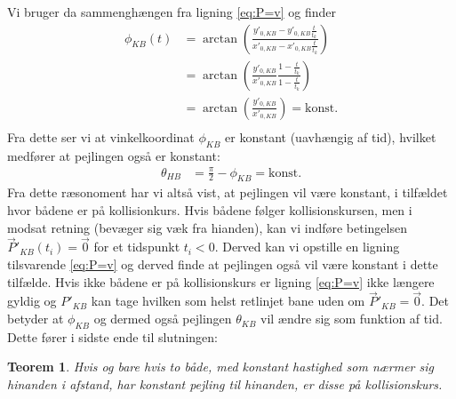 \documentclass[%
 reprint,
nofootinbib,
aps,
]{revtex4-1}
\newtheorem{theorem}{Teorem}
\begin{document}
Vi bruger da sammenghængen fra ligning \ref{eq:P=v} og finder
\begin{align*}
  \phi_{KB}(t) &= \arctan{\left( \frac{y'_{0,KB} - y'_{0,KB}\frac{t}{t_k}}{x'_{0,KB} - x'_{0,KB}\frac{t}{t_k}}\right)} \\
  &= \arctan{\left(\frac{y'_{0,KB}}{x'_{0,KB}} \frac{1 - \frac{t}{t_k}}{1 - \frac{t}{t_k}}\right)} \\
  &= \arctan{\left(\frac{y'_{0,KB}}{x'_{0,KB}}\right)} = \text{konst.} \\
\end{align*}
Fra dette ser vi at vinkelkoordinat $\phi_{KB}$ er konstant (uavhængig af tid), hvilket medfører at pejlingen også er konstant:
\begin{align*}
  \theta_{HB} &= \frac{\pi}{2} - \phi_{KB} = \text{konst.}
\end{align*}
Fra dette ræsonoment har vi altså vist, at pejlingen vil være konstant, i tilfældet hvor bådene er på kollisionkurs. Hvis bådene følger kollisionskursen, men i modsat retning (bevæger sig væk fra hianden), kan vi indføre betingelsen $\vec{P}'_{KB}(t_i) = \vec{0}$ for et tidspunkt $t_i < 0$. Derved kan vi opstille en ligning tilsvarende \ref{eq:P=v} og derved finde at pejlingen også vil være konstant i dette tilfælde. Hvis ikke bådene er på kollisionskurs er ligning \ref{eq:P=v} ikke længere gyldig og $P'_{KB}$ kan tage hvilken som helst retlinjet bane uden om $\vec{P}'_{KB} = \vec{0}$. Det betyder at $\phi_{KB}$ og dermed også pejlingen $\theta_{KB}$ vil ændre sig som funktion af tid. Dette fører i sidste ende til slutningen:
\begin{theorem}
  Hvis og bare hvis to både, med konstant hastighed som nærmer sig hinanden i afstand, har konstant pejling til hinanden, er disse på kollisionskurs.
  \label{Teo:pejling}
\end{theorem}
\end{document}
